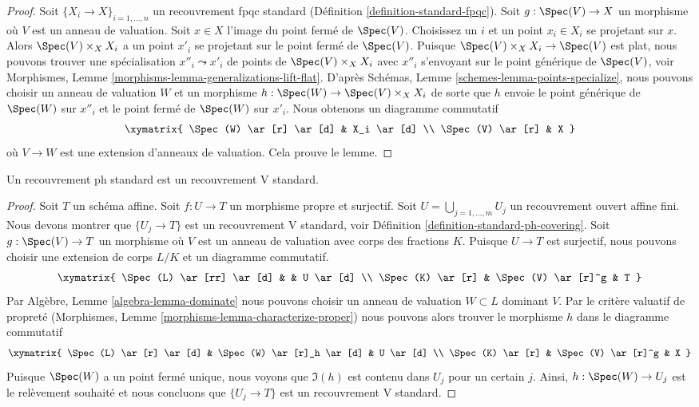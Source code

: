 \begin{proof}
Soit $\{X_i \to X\}_{i = 1, \ldots, n}$ un recouvrement fpqc standard (Définition \ref{definition-standard-fpqc}). Soit $g : \Spec(V) \to X$ un morphisme où $V$ est un anneau de valuation. Soit $x \in X$ l'image du point fermé de $\Spec(V)$. Choisissez un $i$ et un point $x_i \in X_i$ se projetant sur $x$. Alors $\Spec(V) \times_X X_i$ a un point $x'_i$ se projetant sur le point fermé de $\Spec(V)$. Puisque $\Spec(V) \times_X X_i \to \Spec(V)$ est plat, nous pouvons trouver une spécialisation $x''_i \leadsto x'_i$ de points de $\Spec(V) \times_X X_i$ avec $x''_i$ s'envoyant sur le point générique de $\Spec(V)$, voir Morphismes, Lemme \ref{morphisms-lemma-generalizations-lift-flat}. D'après Schémas, Lemme \ref{schemes-lemma-points-specialize}, nous pouvons choisir un anneau de valuation $W$ et un morphisme $h : \Spec(W) \to \Spec(V) \times_X X_i$ de sorte que $h$ envoie le point générique de $\Spec(W)$ sur $x''_i$ et le point fermé de $\Spec(W)$ sur $x'_i$. Nous obtenons un diagramme commutatif
$$
\xymatrix{
\Spec(W) \ar[r] \ar[d] & X_i \ar[d] \\
\Spec(V) \ar[r] & X
}
$$
où $V \to W$ est une extension d'anneaux de valuation. Cela prouve le lemme.
\end{proof}


\begin{lemma}
\label{lemma-standard-ph-standard-V}
Un recouvrement ph standard est un recouvrement V standard.
\end{lemma}

\begin{proof}
Soit $T$ un schéma affine. Soit $f : U \to T$ un morphisme propre et surjectif. Soit $U = \bigcup_{j = 1, \ldots, m} U_j$ un recouvrement ouvert affine fini. Nous devons montrer que $\{U_j \to T\}$ est un recouvrement V standard, voir Définition \ref{definition-standard-ph-covering}. Soit $g : \Spec(V) \to T$ un morphisme où $V$ est un anneau de valuation avec corps des fractions $K$. Puisque $U \to T$ est surjectif, nous pouvons choisir une extension de corps $L/K$ et un diagramme commutatif.
$$
\xymatrix{
\Spec(L) \ar[rr] \ar[d] & & U \ar[d] \\
\Spec(K) \ar[r] & \Spec(V) \ar[r]^g & T
}
$$
Par Algèbre, Lemme \ref{algebra-lemma-dominate} nous pouvons choisir un anneau de valuation $W \subset L$ dominant $V$. Par le critère valuatif de propreté (Morphismes, Lemme \ref{morphisms-lemma-characterize-proper}) nous pouvons alors trouver le morphisme $h$ dans le diagramme commutatif
$$
\xymatrix{
\Spec(L) \ar[r] \ar[d] & \Spec(W) \ar[r]_h \ar[d] & U \ar[d] \\
\Spec(K) \ar[r] & \Spec(V) \ar[r]^g & X
}
$$
Puisque $\Spec(W)$ a un point fermé unique, nous voyons que $\Im(h)$ est contenu dans $U_j$ pour un certain $j$. Ainsi, $h : \Spec(W) \to U_j$ est le relèvement souhaité et nous concluons que $\{U_j \to T\}$ est un recouvrement V standard.
\end{proof}

